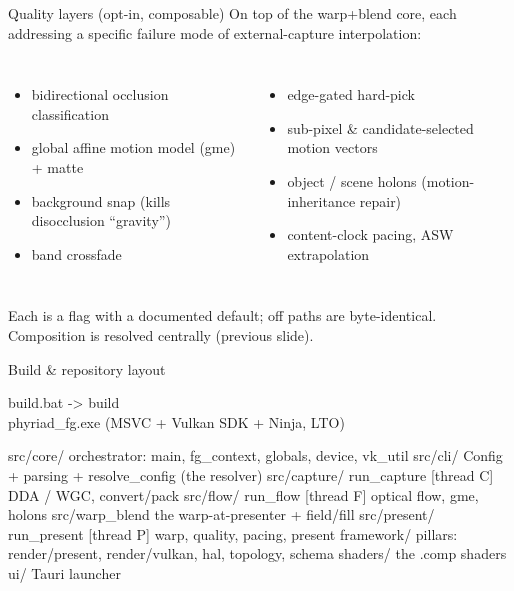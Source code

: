 \documentclass[aspectratio=169]{beamer}
\begin{document}
\begin{frame}{Quality layers (opt-in, composable)}
On top of the warp+blend core, each addressing a specific failure mode of external-capture interpolation:
\begin{columns}[T]
\begin{itemize}\setlength\itemsep{2pt}
  \item bidirectional occlusion classification
  \item global affine motion model (gme) + matte
  \item background snap (kills disocclusion ``gravity'')
  \item band crossfade
\end{itemize}
\begin{itemize}\setlength\itemsep{2pt}
  \item edge-gated hard-pick
  \item sub-pixel \& candidate-selected motion vectors
  \item object / scene holons (motion-inheritance repair)
  \item content-clock pacing, ASW extrapolation
\end{itemize}
\end{columns}
\vfill
{\footnotesize Each is a flag with a documented default; off paths are byte-identical. Composition is
resolved centrally (previous slide).}
\end{frame}

\begin{frame}[fragile]{Build \& repository layout}
\begin{semiverbatim}\scriptsize
build.bat -> build\\phyriad_fg.exe        (MSVC + Vulkan SDK + Ninja, LTO)

src/core/      orchestrator: main, fg_context, globals, device, vk_util
src/cli/       Config + parsing + resolve_config (the resolver)
src/capture/   run_capture  [thread C]  DDA / WGC, convert/pack
src/flow/      run_flow     [thread F]  optical flow, gme, holons
src/warp_blend the warp-at-presenter + field/fill
src/present/   run_present  [thread P]  warp, quality, pacing, present
framework/     pillars: render/present, render/vulkan, hal, topology, schema
shaders/       the .comp shaders        ui/  Tauri launcher
\end{semiverbatim}
\end{frame}
\end{document}
